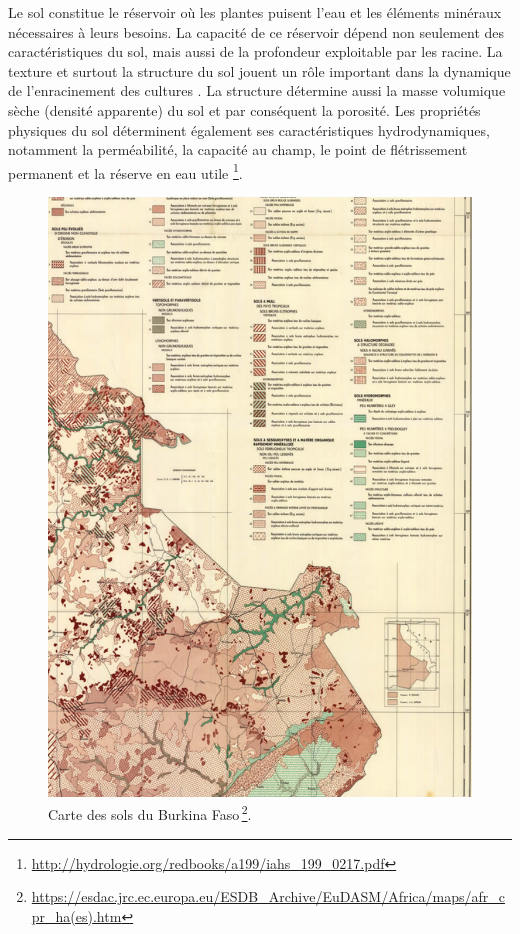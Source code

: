\documentclass[a4paper,11pt]{article}
\begin{document}
Le sol constitue le réservoir où les plantes puisent l'eau et les
éléments minéraux nécessaires à leurs besoins. La capacité de ce
réservoir dépend non seulement des caractéristiques du sol, mais aussi
de la profondeur exploitable par les racine. La texture et surtout la
structure du sol jouent un rôle important dans la dynamique de
l'enracinement des cultures \cite{Chopart_1980}. La structure
détermine aussi la masse volumique sèche (densité apparente) du sol et
par conséquent la porosité. Les propriétés physiques du sol
déterminent également ses caractéristiques hydrodynamiques, notamment
la perméabilité, la capacité au champ, le point de flétrissement
permanent et la réserve en eau utile
\footnote{\url{http://hydrologie.org/redbooks/a199/iahs_199_0217.pdf}}.


\begin{figure}%
  \begin{center}
    \includegraphics[width=12cm]{images/cartepedobf}
  \end{center}
  \caption{Carte des sols du Burkina Faso\,\protect\footnote{\protect\url{https://esdac.jrc.ec.europa.eu/ESDB_Archive/EuDASM/Africa/maps/afr_cpr_ha(es).htm}}.}
\end{figure}
\end{document}
